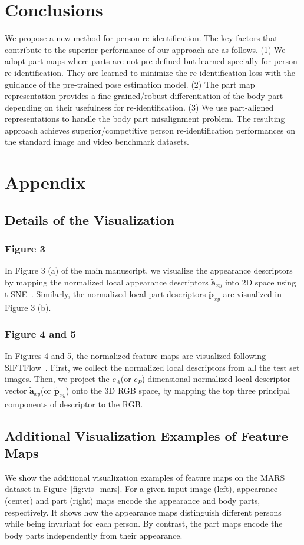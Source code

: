 \documentclass{llncs}
\begin{document}
\section{Conclusions}
We propose a new method for person re-identification.  The key factors that contribute to the superior performance of our approach
are as follows. (1) We adopt part maps where parts are not pre-defined but learned specially for person re-identification. They are learned to minimize the re-identification loss with the guidance of the pre-trained pose estimation model. (2) {\color{black}The part map representation provides a fine-grained/robust differentiation of the body part depending on their usefulness for re-identification.} (3) We use part-aligned representations to handle the body part misalignment problem. The resulting approach achieves superior/competitive person re-identification performances on the standard image and video benchmark datasets.

\appendix
\section{Appendix}

\subsection{Details of the Visualization}
\subsubsection{Figure 3} In Figure 3 (a) of the main manuscript, we visualize the appearance descriptors by mapping the normalized local appearance descriptors $\tilde{\mathbf{a}}_{xy}$ into 2D space using t-SNE~\cite{tsne}. Similarly, the normalized local part descriptors $\tilde{\mathbf{p}}_{xy}$ are visualized in Figure 3 (b).
\subsubsection{Figure 4 and 5} In Figures 4 and 5, the normalized feature maps are visualized following SIFTFlow~\cite{siftflow}. {\color{black} First, we collect the normalized local descriptors from all the test set images.} Then, we project the $c_A$(or $c_P$)-dimensional normalized local descriptor vector $\tilde{\mathbf{a}}_{xy}$(or $\tilde{\mathbf{p}}_{xy}$) onto the 3D RGB space, by mapping the top three principal components of descriptor to the RGB. 


\subsection{Additional Visualization Examples of Feature Maps}
We show the additional visualization examples of feature maps on the MARS dataset in Figure~\ref{fig:vis_mars}.
For a given input image (left), appearance (center) and part (right) maps encode the appearance and body parts, respectively.
It shows how the appearance maps distinguish different persons while being invariant for each person. By contrast, the part maps encode the body parts independently from their appearance.
\end{document}
